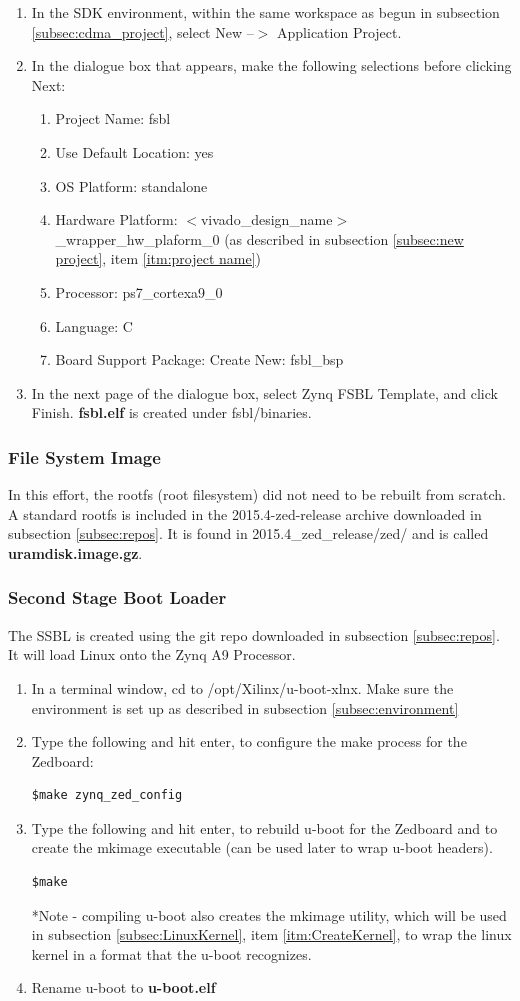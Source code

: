 \documentclass[12pt]{article}
\begin{document}
\begin{enumerate}
\item In the SDK environment, within the same workspace as begun in subsection \ref{subsec:cdma_project}, select New --$>$ Application Project.
\item  In the dialogue box that appears, make the following selections before clicking Next:
\begin{enumerate}
\item Project Name: fsbl
\item Use Default Location: yes
\item OS Platform: standalone
\item Hardware Platform: $<$vivado\_design\_name$>$\_wrapper\_hw\_plaform\_0 (as described in subsection \ref{subsec:new project}, item \ref{itm:project name})
\item Processor: ps7\_cortexa9\_0
\item Language: C
\item Board Support Package: Create New: fsbl\_bsp
\end{enumerate}
\item In the next page of the dialogue box, select Zynq FSBL Template, and click Finish.  \textbf{fsbl.elf} is created under fsbl/binaries.
\end{enumerate}
\subsubsection{File System Image}
In this effort, the rootfs (root filesystem) did not need to be rebuilt from scratch.  A standard rootfs is included in the 2015.4-zed-release archive downloaded in subsection \ref{subsec:repos}.  It is found in 2015.4\_zed\_release/zed/ and is called \textbf{uramdisk.image.gz}.
\subsubsection{Second Stage Boot Loader}
The SSBL is created using the git repo downloaded in subsection \ref{subsec:repos}.  It will load Linux onto the Zynq A9 Processor.
\begin{enumerate}
\item In a terminal window, cd to /opt/Xilinx/u-boot-xlnx.  Make sure the environment is set up as described in subsection \ref{subsec:environment}
\item Type the following and hit enter, to configure the make process for the Zedboard:
\begin{lstlisting}
$make zynq_zed_config
\end{lstlisting}
\item Type the following and hit enter, to rebuild u-boot for the Zedboard and to create the mkimage executable (can be used later to wrap u-boot headers).
\begin{lstlisting}
$make
\end{lstlisting}
*Note - compiling u-boot also creates the mkimage utility, which will be used in subsection \ref{subsec:LinuxKernel}, item \ref{itm:CreateKernel}, to wrap the linux kernel in a format that the u-boot recognizes.
\item Rename u-boot to \textbf{u-boot.elf}
\end{enumerate}
\end{document}
